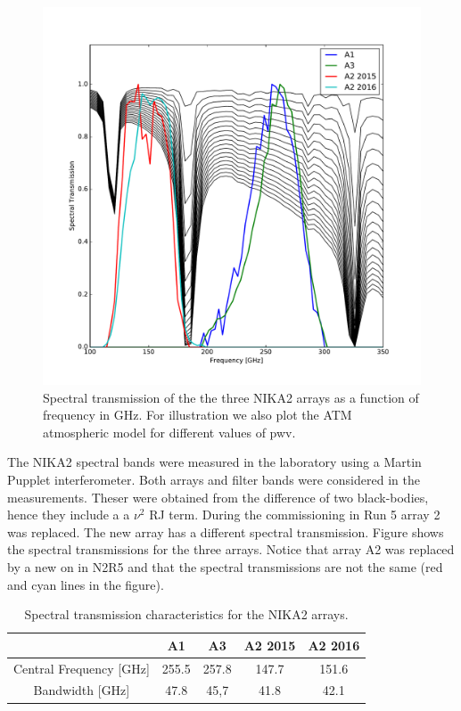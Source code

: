 \begin{figure}[ht] %
\begin{center}
\includegraphics[width=\textwidth]{Figures/SpectralBands/atm_transmission.pdf}
\end{center}
\caption{Spectral transmission of the the three NIKA2 arrays as a function of frequency in GHz. For illustration we also plot the ATM atmospheric model for different values of pwv. \label{spectralband}}
\end{figure}




The NIKA2 spectral bands were measured in the laboratory using a Martin Pupplet interferometer.
Both arrays and filter bands were considered in the measurements. Theser were obtained from the difference of two black-bodies, hence they include a a $\nu^2$ RJ term. During the commissioning in Run 5 array 2 was replaced. The new array has a different spectral transmission. Figure shows the spectral transmissions for the three arrays. Notice that array A2 was replaced by a new on in N2R5 and that the spectral transmissions are not the same (red and cyan lines in the figure).


\begin{table}[h]
\caption{Spectral transmission characteristics for the NIKA2 arrays.%
\label{nika2runs}}
\begin{tabular}{|c|c|c|c|c|}
\hline 
  &     A1  &  A3 &  A2 2015 & A2 2016 \\ 
\hline 
Central Frequency [GHz] &   255.5  & 257.8   &   147.7  & 151.6 \\  
Bandwidth [GHz]         &   47.8   & 45,7    &   41.8   & 42.1 \\
\hline 
\end{tabular} 
\end{table} 


